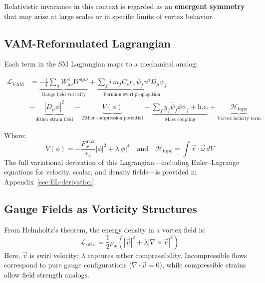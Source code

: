 Relativistic invariance in this context is regarded as an \textbf{emergent symmetry} that may arise at large scales or in specific limits of vortex behavior.

\subsection*{VAM-Reformulated Lagrangian}
Each term in the SM Lagrangian maps to a mechanical analog:

\begin{align*}
    \mathcal{L}_\text{VAM} &= \underbrace{-\frac{1}{4} \sum_{a} W^{a}_{\mu\nu} W^{a\mu\nu}}_{\text{Gauge field vorticity}}
    + \underbrace{\sum_{f} i \, m_f C_e r_c \, \bar{\psi}_f \gamma^\mu D_\mu \psi_f}_{\text{Fermion swirl propagation}} \\
    &- \underbrace{|D_\mu \phi|^2}_{\text{Æther strain field}}
    - \underbrace{V(\phi)}_{\text{Æther compression potential}}
    - \underbrace{\sum_f y_f \bar{\psi}_f \phi \psi_f + \text{h.c.}}_{\text{Mass coupling}}
    + \underbrace{\mathcal{H}_\text{topo}}_{\text{Vortex helicity term}}
\end{align*}

Where:
\[
    V(\phi) = -\frac{F^{\text{max}}_{\text{\ae}}}{r_c}|\phi|^2 + \lambda |\phi|^4
    \quad \text{and} \quad \mathcal{H}_\text{topo} = \int \vec{v} \cdot \vec{\omega} \, dV
\]
The full variational derivation of this Lagrangian—including Euler–Lagrange equations for velocity, scalar, and density fields—is provided in Appendix~\ref{sec:EL-derivation}.

\subsection{Gauge Fields as Vorticity Structures}
From Helmholtz's theorem, the energy density in a vortex field is:
\begin{equation}
    \mathcal{L}_{\text{swirl}} = \frac{1}{2} \rho_\text{\ae} \left( |\vec{v}|^2 + \lambda |\nabla \times \vec{v}|^2 \right)
\end{equation}
Here, $\vec{v}$ is swirl velocity; $\lambda$ captures æther compressibility. Incompressible flows correspond to pure gauge configurations ($\nabla \cdot \vec{v} = 0$), while compressible strains allow field strength analogs.


